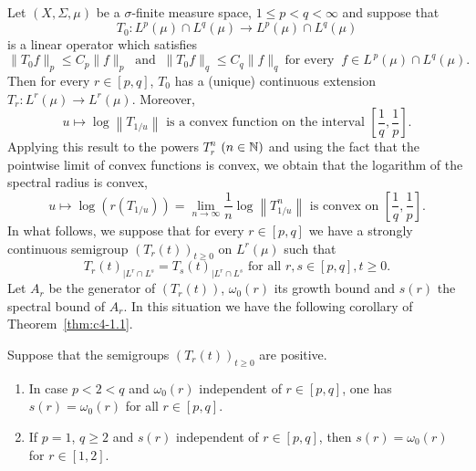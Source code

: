 Let $(X,\Sigma,\mu)$ be a $\sigma$-finite measure space, $1 \leq p < q < \infty$ and suppose that 
\[
T_{0} \colon L^{p}(\mu) \cap L^{q}(\mu) \to L^{p}(\mu) \cap L^{q}(\mu)
\]
is a linear operator which satisfies 
\[
\|T_{0}f\|_{p} \leq C_{p}\|f\|_{p} \ \text{ and } \ \|T_{0}f\|_{q} \leq C_{q}\|f\|_{q} 
\ \text{for every } \ f\in L^{\,p}(\mu) \cap L^{q}(\mu) .
\]
Then for every $r \in [p,q]$, $T_{0}$ has a (unique) continuous extension $T_{r} \colon L^{r}(\mu) \to L^{r}(\mu)$.
Moreover,
\begin{equation}\label{eq:c4-1.1}
u \mapsto \log\left\|T_{1/u}\right\| \text{ is a convex function on the interval } \left[\frac{1}{q},\frac{1}{p}\right].
\end{equation}
Applying this result to the powers $T_{r}^{n}$ $(n \in\mathbb{N})$ and using the fact that the pointwise limit of convex functions is convex, we obtain that the logarithm of the spectral radius is convex, \ie
\begin{equation}\label{eq:c4-1.2}
u \mapsto \log(r(T_{1/u})) = \lim_{n\to\infty} \frac{1}{n}\log\left\|T_{1/u}^{n}\right\| \text{ is convex on }  \left[\frac{1}{q},\frac{1}{p}\right].
\end{equation}
In what follows, we suppose that for every $r \in [p,q]$ we have a strongly continuous semigroup $(T_{r}(t))_{t\geq 0}$ on $L^{r}(\mu)$ such that
\begin{equation}\label{eq:c4-1.3}
T_{r}(t)_{|L^{r} \cap L^{s}} = T_{s}(t)_{|L^{r} \cap L^{s}} \text{ for all } r,s \in [p,q], t \geq 0.
\end{equation}
Let $A_{r}$ be the generator of\/ $(T_{r}(t))$, $\omega_{0}(r)$ its growth bound and $s(r)$ the spectral bound of\/ $A_{r}$.
In this situation we have the following corollary of Theorem~\ref{thm:c4-1.1}.
\begin{corollary}\label{cor:c4-1.2}
Suppose that the semigroups $(T_{r}(t))_{t\geq 0}$ are positive.
\begin{enumerate}[\upshape(i)]
\item \label{cor:c4-1.2-1}
In case $p < 2 < q$ and $\omega_{0}(r)$ independent of\/ $r \in [p,q]$, one has $s(r) = \omega_{0}(r)$ for all $r \in [p,q]$.
\item \label{cor:c4-1.2-2}
If\/ $p = 1$, $q \geq 2$ and $s(r)$ independent of\/ $r \in [p,q]$, then $s(r) = \omega_{0}(r)$ for $r \in [1,2]$.
\end{enumerate}
\end{corollary}
